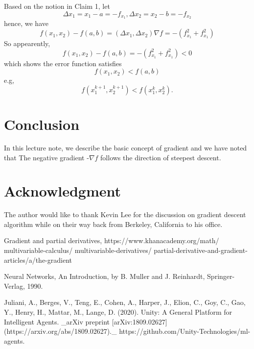 \documentclass[conference]{IEEEtran}
\begin{document}
Based on the notion in Claim 1, let
\begin{equation}
\Delta x_1 = x_1 - a = -f_{x_1}  , 
\Delta x_2 = x_2 - b = -f_{x_2} 
\end{equation}
hence, we have 
\begin{equation}
f(x_1,x_2) - f(a,b)
=(\Delta x_1, \Delta x_2) \nabla f
=-(f_{x_1}^2 + f_{x_1}^2) 
\end{equation}
So appearently, 
\begin{equation}
f(x_1,x_2) - f(a,b) 
=-(f_{x_1}^2 + f_{x_1}^2) < 0  
\end{equation}
which shows the error function satisfies 
\begin{equation}
f(x_1,x_2) < f(a,b)   
\end{equation}
e.g, 
\begin{equation}
f(x_1^{k+1}, x_2^{k+1}) < f(x_1^k, x_2^k). 
\end{equation}

\section{Conclusion}
In this lecture note,  we describe the basic concept of 
gradient and we have noted that 
The negative gradient -$\nabla f$ follows
the direction of steepest descent. 

\section*{Acknowledgment}
The author would like to thank Kevin Lee for the 
discussion on gradient descent algorithm while on their
way back from Berkeley, California to his office.  
 
\begin{thebibliography}{1}


\bibitem{[1]} Gradient and partial derivatives,  
https://www.khanacademy.org/math/ multivariable-calculus/
multivariable-derivatives/ partial-derivative-and-gradient-
articles/a/the-gradient

\bibitem{[2]} Neural Networks, An Introduction, by 
B. Muller and J. Reinhardt, Springer-Verlag, 1990. 

\bibitem{[3]}  
Juliani, A., Berges, V., Teng, E., Cohen, A., Harper, J., Elion, C., Goy, C.,
Gao, Y., Henry, H., Mattar, M., Lange, D. (2020). Unity: A General Platform for
Intelligent Agents. _arXiv preprint
[arXiv:1809.02627](https://arxiv.org/abs/1809.02627)._
https://github.com/Unity-Technologies/ml-agents. 
 

\end{thebibliography}

\end{document}
